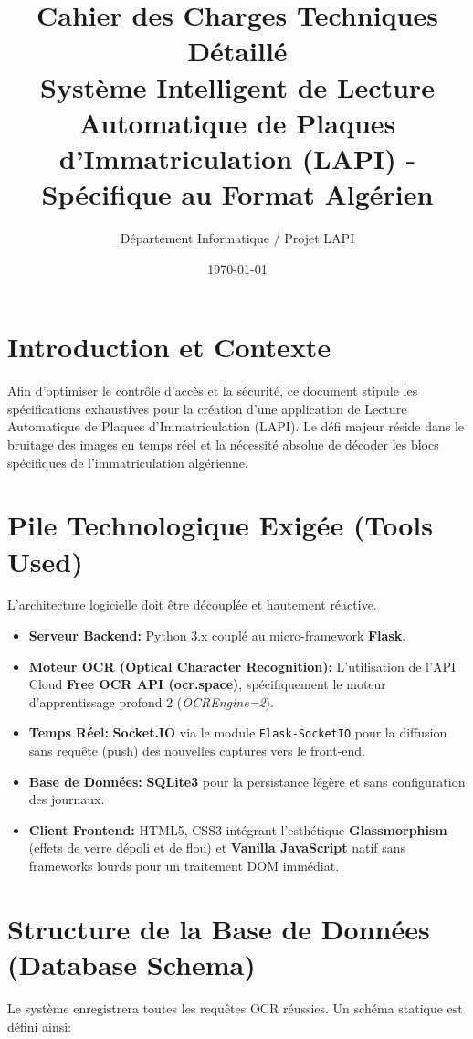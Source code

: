 \documentclass[11pt,a4paper]{article}
\title{\textbf{Cahier des Charges Techniques D\'etaill\'e}\\
\vspace{0.5cm}
\Large Syst\`eme Intelligent de Lecture Automatique de Plaques d'Immatriculation (LAPI) - Sp\'ecifique au Format Alg\'erien}
\author{D\'epartement Informatique / Projet LAPI}
\date{\today}
\begin{document}
\maketitle

\tableofcontents
\newpage

\section{Introduction et Contexte}
Afin d'optimiser le contr\^ole d'acc\`es et la s\'ecurit\'e, ce document stipule les sp\'ecifications exhaustives pour la cr\'eation d'une application de Lecture Automatique de Plaques d'Immatriculation (LAPI). Le d\'efi majeur r\'eside dans le bruitage des images en temps r\'eel et la n\'ecessit\'e absolue de d\'ecoder les blocs sp\'ecifiques de l'immatriculation alg\'erienne.

\section{Pile Technologique Exig\'ee (Tools Used)}
L'architecture logicielle doit \^etre d\'ecoupl\'ee et hautement r\'eactive.
\begin{itemize}
    \item \textbf{Serveur Backend:} Python 3.x coupl\'e au micro-framework \textbf{Flask}.
    \item \textbf{Moteur OCR (Optical Character Recognition):} L'utilisation de l'API Cloud \textbf{Free OCR API (ocr.space)}, sp\'ecifiquement le moteur d'apprentissage profond 2 (\textit{OCREngine=2}).
    \item \textbf{Temps R\'eel:} \textbf{Socket.IO} via le module \texttt{Flask-SocketIO} pour la diffusion sans requ\^ete (push) des nouvelles captures vers le front-end.
    \item \textbf{Base de Donn\'ees:} \textbf{SQLite3} pour la persistance l\'eg\`ere et sans configuration des journaux.
    \item \textbf{Client Frontend:} HTML5, CSS3 int\'egrant l'esth\'etique \textbf{Glassmorphism} (effets de verre d\'epoli et de flou) et \textbf{Vanilla JavaScript} natif sans frameworks lourds pour un traitement DOM imm\'ediat.
\end{itemize}

\section{Structure de la Base de Donn\'ees (Database Schema)}
Le syst\`eme enregistrera toutes les requ\^etes OCR r\'eussies. Un sch\'ema statique est d\'efini ainsi:
\end{document}

